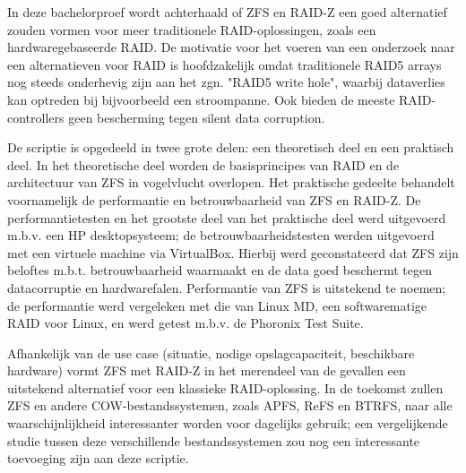 In deze bachelorproef wordt achterhaald of ZFS en RAID-Z een goed alternatief zouden vormen voor meer traditionele RAID-oplossingen, zoals een hardwaregebaseerde RAID. De motivatie voor het voeren van een onderzoek naar een alternatieven voor RAID is hoofdzakelijk omdat traditionele RAID5 arrays nog steeds onderhevig zijn aan het zgn. "RAID5 write hole", waarbij dataverlies kan optreden bij bijvoorbeeld een stroompanne. Ook bieden de meeste RAID-controllers geen bescherming tegen silent data corruption.

De scriptie is opgedeeld in twee grote delen: een theoretisch deel en een praktisch deel. In het theoretische deel worden de basisprincipes van RAID en de architectuur van ZFS in vogelvlucht overlopen. Het praktische gedeelte behandelt voornamelijk de performantie en betrouwbaarheid van ZFS en RAID-Z. 
De performantietesten en het grootste deel van het praktische deel werd uitgevoerd m.b.v. een HP desktopsysteem; de betrouwbaarheidstesten werden uitgevoerd met een virtuele machine via VirtualBox. Hierbij werd geconstateerd dat ZFS zijn beloftes m.b.t. betrouwbaarheid waarmaakt en de data goed beschermt tegen datacorruptie en hardwarefalen. Performantie van ZFS is uitstekend te noemen; de performantie werd vergeleken met die van Linux MD, een softwarematige RAID voor Linux, en werd getest m.b.v. de Phoronix Test Suite.

Afhankelijk van de use case (situatie, nodige opslagcapaciteit, beschikbare hardware) vormt ZFS met RAID-Z in het merendeel van de gevallen een uitstekend alternatief voor een klassieke RAID-oplossing. In de toekomst zullen ZFS en andere COW-bestandssystemen, zoals APFS, ReFS en BTRFS, naar alle waarschijnlijkheid interessanter worden voor dagelijks gebruik; een vergelijkende studie tussen deze verschillende bestandssystemen zou nog een interessante toevoeging zijn aan deze scriptie.
